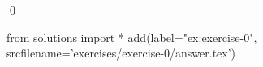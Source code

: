 
\begin{ex} 
  \label{ex:exercise-0}
  
  \qed
\end{ex} 
\begin{python0}
from solutions import *
add(label="ex:exercise-0",
    srcfilename='exercises/exercise-0/answer.tex') 
\end{python0}
